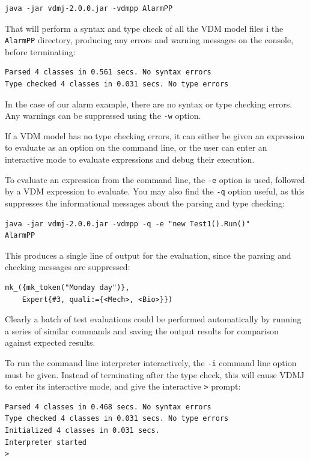 \begin{lstlisting}
java -jar vdmj-2.0.0.jar -vdmpp AlarmPP
\end{lstlisting}

\noindent That will perform a syntax and type check of all the
VDM model files i the \verb|AlarmPP| directory, producing any
errors and warning messages on the console, before terminating:

\begin{lstlisting}
Parsed 4 classes in 0.561 secs. No syntax errors
Type checked 4 classes in 0.031 secs. No type errors
\end{lstlisting}

\noindent In the case of our alarm example, there are no syntax or
type checking errors. Any warnings can be suppressed using the
\verb|-w| option.

If a VDM model has no type checking errors, it can either be given
an expression to evaluate as an option on the command line, or the
user can enter an interactive mode to evaluate expressions and debug
their execution.

To evaluate an expression from the command line, the \verb|-e| option
is used, followed by a VDM expression to evaluate. You may also find
the \verb|-q| option useful, as this suppresses the informational
messages about the parsing and type checking:

\begin{lstlisting}
java -jar vdmj-2.0.0.jar -vdmpp -q -e "new Test1().Run()" 
AlarmPP
\end{lstlisting}

\noindent This produces a single line of output for the evaluation, since the
parsing and checking messages are suppressed:

\begin{lstlisting}
mk_({mk_token("Monday day")},
	Expert{#3, quali:={<Mech>, <Bio>}})
\end{lstlisting}

Clearly a batch of test evaluations could be performed automatically by running
a series of similar commands and saving the output results for comparison
against expected results.

To run the command line interpreter interactively, the \verb|-i| command line
option must be given. Instead of terminating after the type check, this will
cause VDMJ to enter its interactive mode, and give the interactive \verb|>|
prompt:

\begin{lstlisting}
Parsed 4 classes in 0.468 secs. No syntax errors
Type checked 4 classes in 0.031 secs. No type errors
Initialized 4 classes in 0.031 secs. 
Interpreter started
>  
\end{lstlisting}

